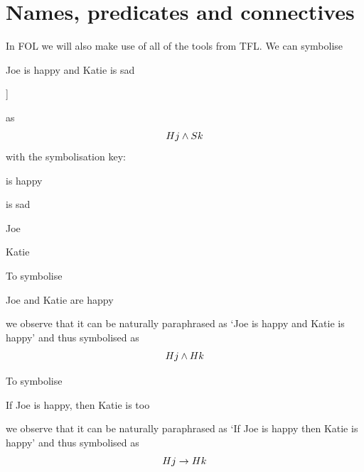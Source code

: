 \section{Names, predicates and connectives}
In FOL we will also make use of all of the tools from TFL.
We can symbolise
\begin{samplesent}
	\item\label{sent:foland} Joe is happy and Katie is sad
\end{samplesent}
\begin{center}
	\begin{forest}
		[Joe is happy and Katie is sad\\$\ldots {\eand} \ldots$
		[Joe is happy\\$Hj$]
		[Katie is sad\\$Sk$]
		]
	\end{forest}
\end{center}
as
$$Hj\mathbin{\wedge} Sk$$
with the symbolisation key:
\begin{ekey}
\item[Hx] is happy
\item[Sx] is sad
\item[j] Joe
\item[k] Katie
\end{ekey}

To symbolise
\begin{samplesent}
\item\label{sent:folor} Joe and Katie are happy
\end{samplesent}
we observe that it can be naturally paraphrased as
`Joe is happy and Katie is happy' and thus symbolised as $$Hj\mathbin{\wedge} Hk$$

To symbolise
\begin{samplesent}
\item\label{sent:folor} If Joe is happy, then Katie is too
\end{samplesent}
we observe that it can be naturally paraphrased as
`If Joe is happy then Katie is happy' and thus symbolised as $$Hj\rightarrow Hk$$

